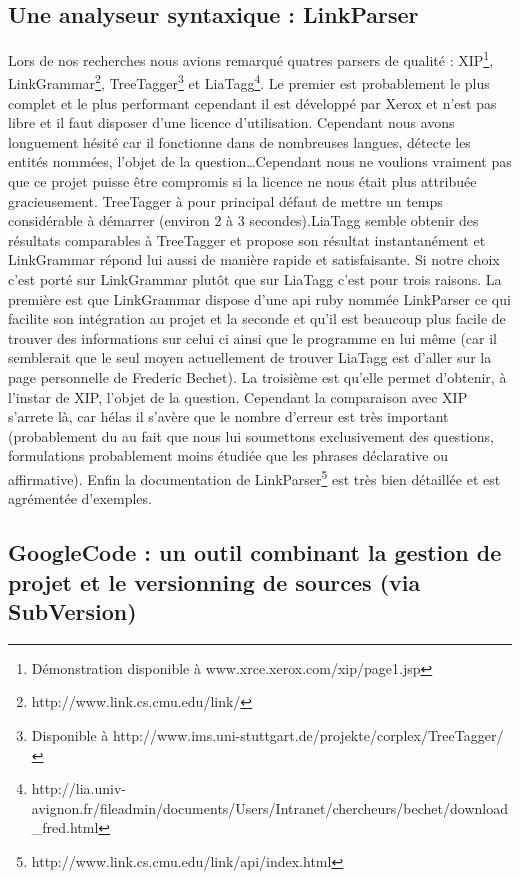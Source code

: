 \documentclass[10pt,a4paper]{article}
\begin{document}
\subsection{Une analyseur syntaxique : LinkParser}
Lors de nos recherches nous avions remarqué quatres parsers de qualité : XIP\footnote{Démonstration disponible à www.xrce.xerox.com/xip/page1.jsp}, LinkGrammar\footnote{http://www.link.cs.cmu.edu/link/}, TreeTagger\footnote{Disponible à http://www.ims.uni-stuttgart.de/projekte/corplex/TreeTagger/} et LiaTagg\footnote{http://lia.univ-avignon.fr/fileadmin/documents/Users/Intranet/chercheurs/bechet/download\_fred.html}.
Le premier est probablement le plus complet et le plus performant cependant il est développé par Xerox et n'est pas libre et il faut disposer d'une licence d'utilisation. Cependant nous avons longuement hésité car il fonctionne dans de nombreuses langues, détecte les entités nommées, l'objet de la question\ldots Cependant nous ne voulions vraiment pas que ce projet puisse être compromis si la licence ne nous était plus attribuée gracieusement.
TreeTagger à pour principal défaut de mettre un temps considérable à démarrer (environ 2 à 3 secondes).LiaTagg semble obtenir des résultats comparables à TreeTagger et propose son résultat instantanément et LinkGrammar répond lui aussi de manière rapide et satisfaisante.
Si notre choix c'est porté sur LinkGrammar plutôt que sur LiaTagg c'est pour trois raisons. La première est que LinkGrammar dispose d'une api ruby nommée LinkParser ce qui facilite son intégration au projet et la seconde et qu'il est beaucoup plus facile de trouver des informations sur celui ci ainsi que le programme en lui même (car il semblerait que le seul moyen actuellement de trouver LiaTagg est d'aller sur la page personnelle de Frederic Bechet). La troisième est qu'elle permet d'obtenir, à l'instar de XIP, l'objet de la question. Cependant la comparaison avec XIP s'arrete là, car hélas il s'avère que le nombre d'erreur est très important (probablement du au fait que nous lui soumettons exclusivement des questions, formulations probablement moins étudiée que les phrases déclarative ou affirmative). Enfin la documentation de LinkParser\footnote{http://www.link.cs.cmu.edu/link/api/index.html} est très bien détaillée et est agrémentée d'exemples.

\subsection{GoogleCode : un outil combinant la gestion de projet et le versionning de sources (via SubVersion)}
\end{document}
